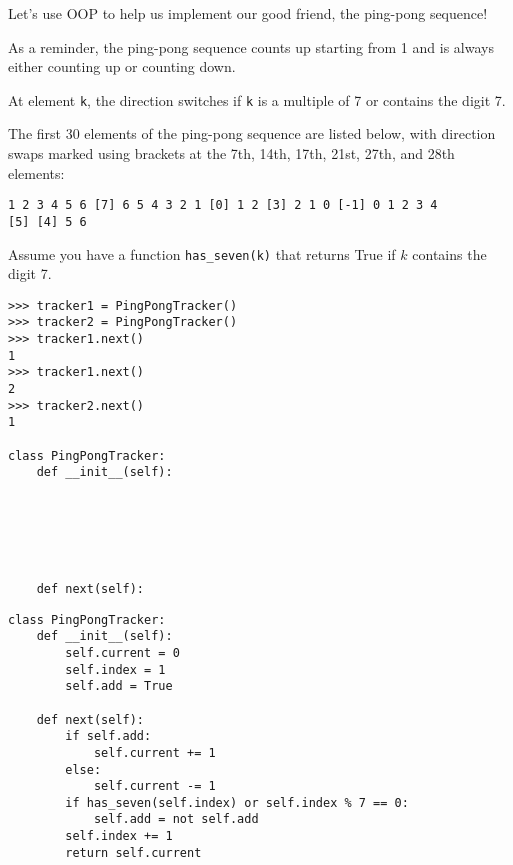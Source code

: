 \begin{blocksection}
\question Let's use OOP to help us implement our good friend, the ping-pong sequence!

As a reminder, the ping-pong sequence counts up starting from 1 and is
always either counting up or counting down.

At element \lstinline{k}, the direction switches if \lstinline{k} is a multiple of 7 or contains the
digit 7.

The first 30 elements of the ping-pong sequence are listed below, with direction
swaps marked using brackets at the 7th, 14th, 17th, 21st, 27th, and 28th
elements:
\begin{lstlisting}
1 2 3 4 5 6 [7] 6 5 4 3 2 1 [0] 1 2 [3] 2 1 0 [-1] 0 1 2 3 4
[5] [4] 5 6
\end{lstlisting}

Assume you have a function \texttt{has\_seven(k)} that returns True if $k$ contains the digit 7.

\vspace{1\baselineskip}
\begin{lstlisting}
>>> tracker1 = PingPongTracker()
>>> tracker2 = PingPongTracker()
>>> tracker1.next()
1
>>> tracker1.next()
2
>>> tracker2.next()
1

class PingPongTracker:
    def __init__(self):






    def next(self):
\end{lstlisting}
\end{blocksection}

\begin{blocksection}
\begin{solution}[0.3in]
\begin{lstlisting}
class PingPongTracker:
    def __init__(self):
        self.current = 0
        self.index = 1
        self.add = True

    def next(self):
        if self.add:
            self.current += 1
        else:
            self.current -= 1
        if has_seven(self.index) or self.index % 7 == 0:
            self.add = not self.add
        self.index += 1
        return self.current

\end{lstlisting}
\end{solution}

\end{blocksection}
